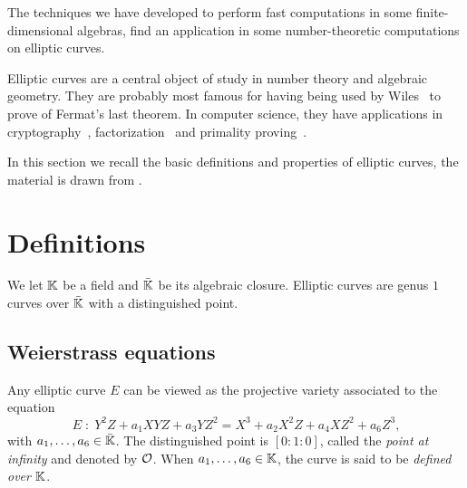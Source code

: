 

The techniques we have developed to perform fast computations in some
finite-dimensional algebras, find an application in some
number-theoretic computations on elliptic curves.

Elliptic curves are a central object of study in number theory and
algebraic geometry. They are probably most famous for having being
used by Wiles~\cite{wiles95,wiles+taylor95} to prove of Fermat's last
theorem. In computer science, they have applications in
cryptography~\cite{koblitz87,miller86,blake+seroussi+smart},
factorization~\cite{lenstra87,atkin+morain93,bernstein+birkner+lange+peters08-2}
and primality proving~\cite{atkin+morain93:2,morain07}.

In this section we recall the basic definitions and properties of
elliptic curves, the material is drawn from
\cite{silverman:elliptic,milne1996elliptic,connell:elliptic}.


\section{Definitions}
\label{sec:definitions}

We let $\mathbb{K}$ be a field and $\bar{\mathbb{K}}$ be its algebraic
closure. Elliptic curves are genus $1$ curves
over $\bar{\mathbb{K}}$ with a distinguished point.

\subsection{Weierstrass equations}
\label{sec:weierstr-equat}

\begin{definition}
   Any elliptic curve $E$ can be viewed as
  the projective variety associated to the equation
  \begin{equation}
    \label{eq:107}
    E\;:\; Y^2Z + a_1XYZ + a_3YZ^2 = X^3 + a_2X^2Z + a_4XZ^2 + a_6Z^3
    \text{,}
  \end{equation}
  with $a_1,\ldots,a_6\in\bar{\mathbb{K}}$.  The distinguished point is
  $[0:1:0]$, called the \emph{point at
    infinity} and denoted by $\mathcal{O}$.  When $a_1,\ldots,a_6\in\mathbb{K}$, the
  curve is said to be \emph{defined over $\mathbb{K}$}.
\end{definition}

